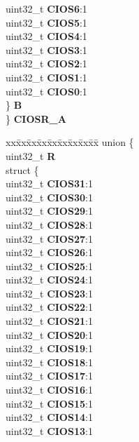 \begin{DoxyCompactItemize}
\begin{tabbing}
\>\>uint32\_t {\bfseries CIOS6}:1\\
\>\>uint32\_t {\bfseries CIOS5}:1\\
\>\>uint32\_t {\bfseries CIOS4}:1\\
\>\>uint32\_t {\bfseries CIOS3}:1\\
\>\>uint32\_t {\bfseries CIOS2}:1\\
\>\>uint32\_t {\bfseries CIOS1}:1\\
\>\>uint32\_t {\bfseries CIOS0}:1\\
\>\} {\bfseries B}\\
\} {\bfseries CIOSR\_A}\\

\end{tabbing}\item 
\mbox{\label{structETPU__tag_a1dc7a3e55d69949254f4c0f857d6a2f5}} 
\begin{tabbing}
xx\=xx\=xx\=xx\=xx\=xx\=xx\=xx\=xx\=\kill
union \{\\
\>uint32\_t {\bfseries R}\\
\>struct \{\\
\>\>uint32\_t {\bfseries CIOS31}:1\\
\>\>uint32\_t {\bfseries CIOS30}:1\\
\>\>uint32\_t {\bfseries CIOS29}:1\\
\>\>uint32\_t {\bfseries CIOS28}:1\\
\>\>uint32\_t {\bfseries CIOS27}:1\\
\>\>uint32\_t {\bfseries CIOS26}:1\\
\>\>uint32\_t {\bfseries CIOS25}:1\\
\>\>uint32\_t {\bfseries CIOS24}:1\\
\>\>uint32\_t {\bfseries CIOS23}:1\\
\>\>uint32\_t {\bfseries CIOS22}:1\\
\>\>uint32\_t {\bfseries CIOS21}:1\\
\>\>uint32\_t {\bfseries CIOS20}:1\\
\>\>uint32\_t {\bfseries CIOS19}:1\\
\>\>uint32\_t {\bfseries CIOS18}:1\\
\>\>uint32\_t {\bfseries CIOS17}:1\\
\>\>uint32\_t {\bfseries CIOS16}:1\\
\>\>uint32\_t {\bfseries CIOS15}:1\\
\>\>uint32\_t {\bfseries CIOS14}:1\\
\>\>uint32\_t {\bfseries CIOS13}:1\\

\end{tabbing}
\end{DoxyCompactItemize}
